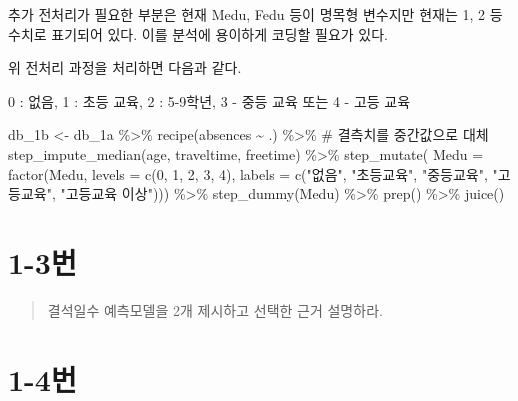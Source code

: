 \documentclass[
  letterpaper,
  DIV=11,
  numbers=noendperiod]{scrreprt}
\newenvironment{Shaded}{\begin{snugshade}}{\end{snugshade}}
\newcommand{\AttributeTok}[1]{\textcolor[rgb]{0.40,0.45,0.13}{#1}}
\newcommand{\CommentTok}[1]{\textcolor[rgb]{0.37,0.37,0.37}{#1}}
\newcommand{\DecValTok}[1]{\textcolor[rgb]{0.68,0.00,0.00}{#1}}
\newcommand{\FunctionTok}[1]{\textcolor[rgb]{0.28,0.35,0.67}{#1}}
\newcommand{\NormalTok}[1]{\textcolor[rgb]{0.00,0.23,0.31}{#1}}
\newcommand{\OtherTok}[1]{\textcolor[rgb]{0.00,0.23,0.31}{#1}}
\newcommand{\SpecialCharTok}[1]{\textcolor[rgb]{0.37,0.37,0.37}{#1}}
\newcommand{\StringTok}[1]{\textcolor[rgb]{0.13,0.47,0.30}{#1}}
\begin{document}
추가 전처리가 필요한 부분은 현재 Medu, Fedu 등이 명목형 변수지만 현재는
1, 2 등 수치로 표기되어 있다. 이를 분석에 용이하게 코딩할 필요가 있다.

위 전처리 과정을 처리하면 다음과 같다.

0 : 없음, 1 : 초등 교육, 2 : 5-9학년, 3 - 중등 교육 또는 4 - 고등 교육

\begin{Shaded}
\begin{Highlighting}[]
\NormalTok{db\_1b }\OtherTok{\textless{}{-}}\NormalTok{ db\_1a }\SpecialCharTok{\%\textgreater{}\%}
  \FunctionTok{recipe}\NormalTok{(absences }\SpecialCharTok{\textasciitilde{}}\NormalTok{ .) }\SpecialCharTok{\%\textgreater{}\%}
  \CommentTok{\# 결측치를 중간값으로 대체}
  \FunctionTok{step\_impute\_median}\NormalTok{(age, traveltime, freetime) }\SpecialCharTok{\%\textgreater{}\%}
  \FunctionTok{step\_mutate}\NormalTok{(}
    \AttributeTok{Medu =} \FunctionTok{factor}\NormalTok{(Medu, }\AttributeTok{levels =} \FunctionTok{c}\NormalTok{(}\DecValTok{0}\NormalTok{, }\DecValTok{1}\NormalTok{, }\DecValTok{2}\NormalTok{, }\DecValTok{3}\NormalTok{, }\DecValTok{4}\NormalTok{), }\AttributeTok{labels =} \FunctionTok{c}\NormalTok{(}\StringTok{"없음"}\NormalTok{, }\StringTok{"초등교육"}\NormalTok{, }\StringTok{"중등교육"}\NormalTok{, }\StringTok{"고등교육"}\NormalTok{, }\StringTok{"고등교육 이상"}\NormalTok{))) }\SpecialCharTok{\%\textgreater{}\%}
  \FunctionTok{step\_dummy}\NormalTok{(Medu) }\SpecialCharTok{\%\textgreater{}\%}
  \FunctionTok{prep}\NormalTok{() }\SpecialCharTok{\%\textgreater{}\%} \FunctionTok{juice}\NormalTok{()}
\end{Highlighting}
\end{Shaded}

\hypertarget{uxbc88-63}{%
\section*{1-3번}\label{uxbc88-63}}


\begin{quote}
결석일수 예측모델을 2개 제시하고 선택한 근거 설명하라.
\end{quote}

\hypertarget{uxbc88-64}{%
\section*{1-4번}\label{uxbc88-64}}
\end{document}
